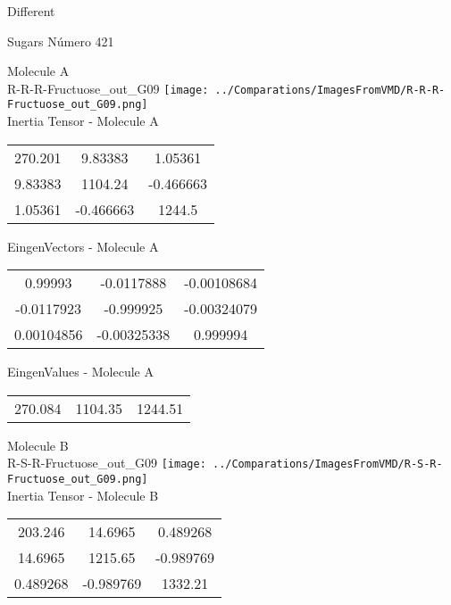 \begin{center}
\vtab
\vtab
\textcolor{NavyBlue}{\Large Different}
\end{center}

 \newpage

\vtab[-2cm]
\begin{center}
{\large Sugars \tab Número 421}
\end{center}
\begin{multicols}{2}
\begin{center}

Molecule A \\ 
R-R-R-Fructuose\_out\_G09
\texttt{[image: ../Comparations/ImagesFromVMD/R-R-R-Fructuose\_out\_G09.png]}
\\
Inertia Tensor - Molecule A \\
\vtab

\begin{tabular}{|c c c|}
270.201	 & 	9.83383	 & 	1.05361	 \\
9.83383	 & 	1104.24	 & 	-0.466663	 \\
1.05361	 & 	-0.466663	 & 	1244.5
\end{tabular}

\vtab
 EingenVectors - Molecule A     \\
\vtab
\begin{tabular}{|c c c|}
0.99993	 & 	-0.0117888	 & 	-0.00108684	 \\
-0.0117923	 & 	-0.999925	 & 	-0.00324079	 \\
0.00104856	 & 	-0.00325338	 & 	0.999994
\end{tabular}

\vtab
 EingenValues - Molecule A     \\
\vtab
\begin{tabular}{|c c c|}
270.084	 & 	1104.35	 & 	1244.51	 \\
\end{tabular}
\columnbreak

Molecule B \\ 
R-S-R-Fructuose\_out\_G09
\texttt{[image: ../Comparations/ImagesFromVMD/R-S-R-Fructuose\_out\_G09.png]}
\\
Inertia Tensor - Molecule B \\
\vtab

\begin{tabular}{|c c c|}
203.246	 & 	14.6965	 & 	0.489268	 \\
14.6965	 & 	1215.65	 & 	-0.989769	 \\
0.489268	 & 	-0.989769	 & 	1332.21
\end{tabular}


\end{center}
\end{multicols}
